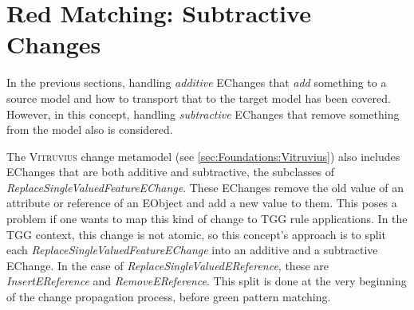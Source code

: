 \section{Red Matching: Subtractive Changes}
\label{sec:Concept:RedMatching}

In the previous sections, handling \emph{additive} EChanges that \emph{add} something to a source model and how to transport that to the target model has been covered.
However, in this concept, handling \emph{subtractive} EChanges that remove something from the model also is considered.

The \textsc{Vitruvius} change metamodel (see \autoref{sec:Foundations:Vitruvius}) also includes EChanges that are both additive and subtractive, the subclasses of \emph{ReplaceSingleValuedFeatureEChange}.
These EChanges remove the old value of an attribute or reference of an EObject and add a new value to them.
This poses a problem if one wants to map this kind of change to TGG rule applications.
In the TGG context, this change is not atomic, so this concept's approach is to split each \emph{ReplaceSingleValuedFeatureEChange} into an additive and a subtractive EChange. In the case of \emph{ReplaceSingleValuedEReference}, these are \emph{InsertEReference} and \emph{RemoveEReference}.
This split is done at the very beginning of the change propagation process, before green pattern matching.

